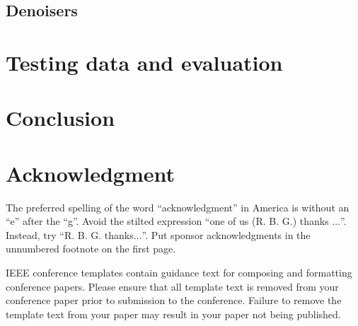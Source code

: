 \documentclass[conference]{IEEEtran}
\begin{document}
\subsection{Denoisers}

\section{Testing data and evaluation}


\section{Conclusion}

\section*{Acknowledgment}

The preferred spelling of the word ``acknowledgment'' in America is without 
an ``e'' after the ``g''. Avoid the stilted expression ``one of us (R. B. 
G.) thanks $\ldots$''. Instead, try ``R. B. G. thanks$\ldots$''. Put sponsor 
acknowledgments in the unnumbered footnote on the first page.




\vspace{12pt}
\color{red}
IEEE conference templates contain guidance text for composing and formatting conference papers. Please ensure that all template text is removed from your conference paper prior to submission to the conference. Failure to remove the template text from your paper may result in your paper not being published.
\end{document}
